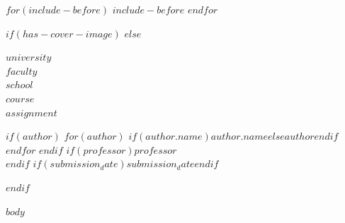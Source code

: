 \documentclass[$if(fontsize)$$fontsize$$else$12pt$endif$,$if(lang)$$lang$$else$spanish$endif$]{$if(documentclass)$$documentclass$$else$article$endif$}
\begin{document}
$for(include-before)$
$include-before$
$endfor$

$if(has-cover-image)$
$else$
\begin{center}
    {\bfseries \Large $university$}\\[0.3cm]
    {\bfseries \large $faculty$}\\[0.2cm]
    {\bfseries $school$}\\[1.5cm]
    
    {\bfseries \large $course$}\\[1cm]
    
    {\bfseries \Large $assignment$}\\[1.5cm]
\end{center}

\begin{center}
    $if(author)$
        $for(author)$
            $if(author.name)$$author.name$$else$$author$$endif$ \\
        $endfor$
    $endif$
    \vspace{0.5cm}
    $if(professor)$$professor$ \\ $endif$
    $if(submission_date)$$submission_date$$endif$
\end{center}

\vspace{1cm}
$endif$

\onehalfspacing
\setlength{\parindent}{1.27cm}

$body$
\end{document}
